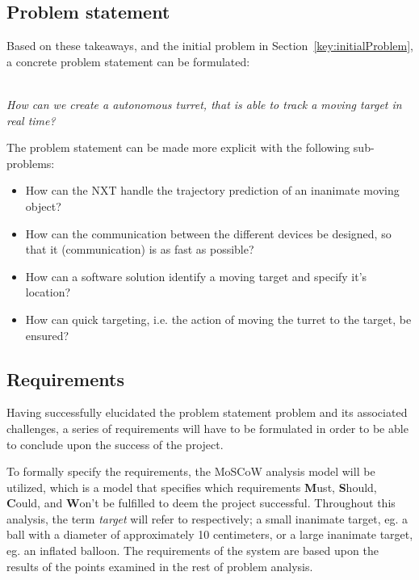 \subsection{Problem statement}
Based on these takeaways, and the initial problem in Section~\ref{key:initialProblem}, a concrete problem statement can be formulated:\\~\\

\begin{center}
	\textit{\large{How can we create a autonomous turret, that is able to track a moving target in real time?}}
\end{center}

The problem statement can be made more explicit with the following sub-problems:
\begin{center}
	\begin{itemize}
		\item How can the NXT handle the trajectory prediction of an inanimate moving object?
		\item How can the communication between the different devices be designed, so that it (communication) is as fast as possible?
		\item How can a software solution identify a moving target and specify it's location?
		\item How can quick targeting, i.e. the action of moving the turret to the target, be ensured?
	\end{itemize}
\end{center}


\subsection{Requirements}\label{subsec:requirements}
Having successfully elucidated the problem statement problem and its associated challenges, a series  of requirements will have to be formulated in order to be able to conclude upon the success of the project.


To formally specify the requirements, the MoSCoW analysis model will be utilized, which is a model that specifies which requirements \textbf{M}ust, \textbf{S}hould, \textbf{C}ould, and \textbf{W}on't be fulfilled to deem the project successful. 
Throughout this analysis, the term \textit{target} will refer to respectively; a small inanimate target, eg{.} a ball with a diameter of approximately 10 centimeters, or a large inanimate target, eg{.} an inflated balloon.
The requirements of the system are based upon the results of the points examined in the rest of problem analysis.

